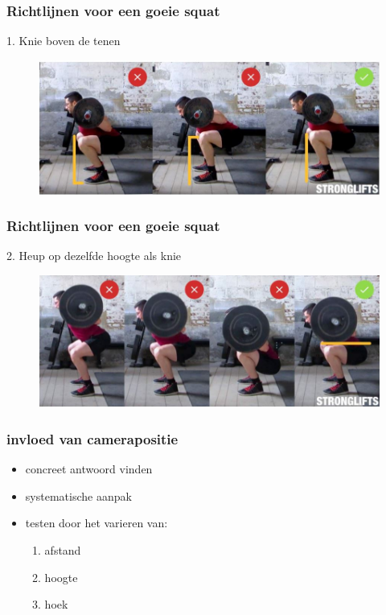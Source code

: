 \documentclass
   [kulak] %
   {kulakbeamer}
\begin{document}
\begin{frame}
	\frametitle{Richtlijnen voor een goeie squat}
	1. Knie boven de tenen
	\begin{figure}
		\includegraphics[width= \textwidth]{squat_knie}
	\end{figure}
\end{frame}

\begin{frame}
\frametitle{Richtlijnen voor een goeie squat}
2. Heup op dezelfde hoogte als knie
\begin{figure}
	\includegraphics[width= \textwidth]{squat_heup}
\end{figure}
\end{frame}

\begin{frame}
	\frametitle{invloed van camerapositie}
	\begin{itemize}
		\item concreet antwoord vinden
		\item systematische aanpak
		\item testen door het varieren van:\begin{enumerate}
			\item afstand
			\item hoogte
			\item hoek
		\end{enumerate}
	\end{itemize}
\end{frame}
\end{document}
